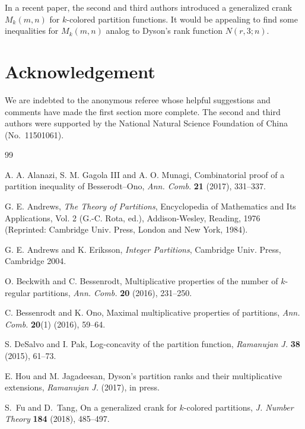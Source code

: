 \documentclass[12pt,reqno]{amsart}
\numberwithin{equation}{section}
\theoremstyle{plain}
\theoremstyle{definition}
\begin{document}
In a recent paper, the second and third authors \cite{FT2017} introduced a generalized crank $M_{k}(m,n)$ for $k$-colored partition functions. It would be appealing to find some inequalities for $M_{k}(m,n)$ analog to Dyson's rank function $N(r,3;n)$.



\section*{Acknowledgement}
We are indebted to the anonymous referee whose helpful suggestions and comments have made the first section more complete. The second and third authors were supported by the National Natural Science Foundation of China (No.~11501061).



\begin{thebibliography}{99}

A. A. Alanazi, S. M. Gagola III and A. O. Munagi, Combinatorial proof of a partition inequality of Besserodt--Ono, \textit{Ann. Comb.} {\bf 21} (2017), 331--337.

G. E. Andrews, \emph{The Theory of Partitions}, Encyclopedia of Mathematics and Its Applications, Vol. 2 (G.-C. Rota, ed.), Addison-Wesley, Reading, 1976 (Reprinted: Cambridge Univ. Press, London and New York, 1984).

G. E. Andrews and K. Eriksson, \emph{Integer Partitions}, Cambridge Univ. Press, Cambridge 2004.

O. Beckwith and C. Bessenrodt, Multiplicative properties of the number of $k$-regular partitions, \textit{Ann. Comb.} {\bf 20} (2016), 231--250.

C. Bessenrodt and K. Ono, Maximal multiplicative properties of partitions, \textit{Ann. Comb.} {\bf 20}(1) (2016), 59--64.

S. DeSalvo and I. Pak, Log-concavity of the partition function, \textit{Ramanujan J.} {\bf 38} (2015), 61--73.

E. Hou and M. Jagadeesan, Dyson's partition ranks and their multiplicative extensions, \textit{Ramanujan J.} (2017), in press.

S.~Fu and D.~Tang, On a generalized crank for $k$-colored partitions, \textit{J. Number Theory} {\bf 184} (2018), 485--497.


\end{thebibliography}
\end{document}
